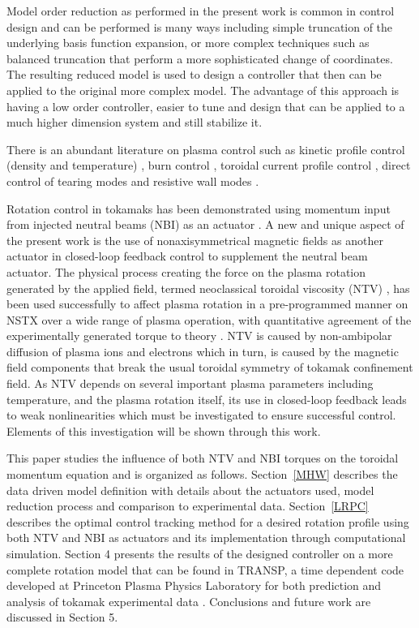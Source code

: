 \documentclass[12pt]{iopart}
\begin{document}
Model order reduction as performed in the present work is common in control design and can be performed is many ways including simple truncation of the underlying basis function expansion, or more complex techniques such as balanced truncation \cite{Moore81} that perform a more sophisticated change of coordinates. The resulting reduced model is used to design a controller that then can be applied to the original more complex model. The advantage of this approach is having a low order controller, easier to tune and design that can be applied to a much higher dimension system and still stabilize it.
 
There is an abundant literature on plasma control such as kinetic profile control (density and temperature) \cite{Schuster02, Boyer11}, burn control \cite{Schuster01, Schuster02-2, Schuster02-3, Vitela98, Boyer12}, toroidal current profile control \cite{Boyer133, Boyer144, Barton12, Ou09, Ebrahimi04}, direct control of tearing modes \cite{Welander13, Volpe09} and resistive wall modes \cite{Sabbagh06,Sabbagh13}.

Rotation control in tokamaks has been demonstrated using momentum input from injected neutral beams (NBI) as an actuator \cite{Scoville07}. A new and unique aspect of the present work is the use of nonaxisymmetrical magnetic fields as another actuator in closed-loop feedback control to supplement the neutral beam actuator. The physical process creating the force on the plasma rotation generated by the applied field, termed neoclassical toroidal viscosity (NTV) \cite{Shaing88, Shaing10}, has been used successfully to affect plasma rotation in a pre-programmed manner on NSTX over a wide range of plasma operation, with quantitative agreement of the experimentally generated torque to theory \cite{Zhu06}. NTV is caused by non-ambipolar diffusion of plasma ions and electrons which in turn, is caused by the magnetic field components that break the usual toroidal symmetry of tokamak confinement field. As NTV depends on several important plasma parameters including temperature, and the plasma rotation itself, its use in closed-loop feedback leads to weak nonlinearities which must be investigated to ensure successful control. Elements of this investigation will be shown through this work. 


This paper studies the influence of both NTV and NBI torques on the toroidal momentum equation and is organized as follows.
 Section~\ref{MHW} describes the data driven model definition with details about the actuators used, model reduction process and comparison to experimental data. Section~\ref{LRPC} describes the optimal control tracking method for a desired rotation profile using both NTV and NBI as actuators and its implementation through computational simulation. Section 4 presents the results of the designed controller on a more complete rotation model that can be found in TRANSP, a time dependent code developed at Princeton Plasma Physics Laboratory for both prediction and analysis of tokamak experimental data \cite{Budny94}. Conclusions and future work are discussed in Section 5.
\end{document}

